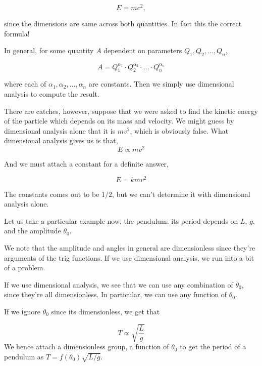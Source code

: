 \begin{equation*}
    E = mc^2,
\end{equation*}

since the dimensions are same across both quantities. In fact this the correct formula!

In general, for some quantity \(A\) dependent on parameters \(Q_1, Q_2, \dots, Q_n\), 

\begin{equation*}
    A = Q_1^{\alpha_1} \cdot Q_2^{\alpha_2} \cdot \dots \cdot Q_n^{\alpha_n}
\end{equation*}

where each of \(\alpha_1, \alpha_2, \dots, \alpha_n\) are constants. Then we simply use dimensional 
analysis to compute the result. 

There are catches, however, suppose that we were asked to find the kinetic 
energy of the particle which depends on its mass and velocity. We might guess 
by dimensional analysis alone that it is \(mv^2\), which is obviously false. What dimensional
analysis gives us is that,
\begin{equation*}
    E \propto mv^2
\end{equation*} 

And we must attach a constant for a definite answer, 

\begin{equation*}
    E = kmv^2
\end{equation*}

The constants comes out to be \(1/2\), but we can't determine it with 
dimensional analysis alone. 

Let us take a particular example now, the pendulum: its period depends on \(L\), \(g\), and the
amplitude \(\theta_0\).  

We note that the amplitude and angles in general are dimensionless since they're arguments 
of the trig functions. If we use dimensional analysis, we run into a bit of a problem.

If we use dimensional analysis, we see that we can use any combination of \(\theta_0\), 
since they're all dimensionless. In particular, we can use any function of \(\theta_0\).

If we ignore \(\theta_0\) since its dimensionless, we get that 

\begin{equation*}
    T \propto \sqrt{\frac{L}{g}}
\end{equation*}
We hence attach a dimensionless group, a function of \(\theta_0\) to get the period of a pendulum as \(T = f (\theta_0)\sqrt{L/g}.\) 

